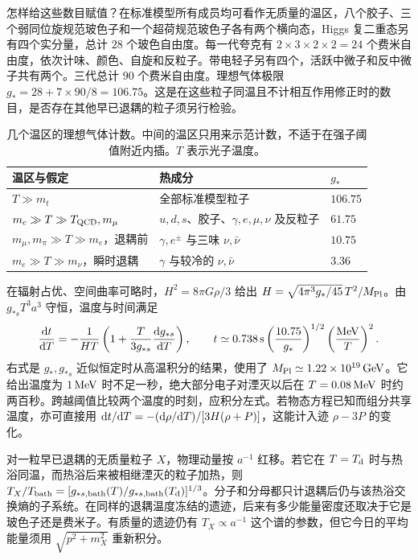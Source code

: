 怎样给这些数目赋值？在标准模型所有成员均可看作无质量的温区，八个胶子、三个弱同位旋规范玻色子和一个超荷规范玻色子各有两个横向态，Higgs 复二重态另有四个实分量，总计 $28$ 个玻色自由度。每一代夸克有 $2\times3\times2\times2=24$ 个费米自由度，依次计味、颜色、自旋和反粒子。带电轻子另有四个，活跃中微子和反中微子共有两个。三代总计 $90$ 个费米自由度。理想气体极限 $g_*=28+7\times90/8=106.75$。这是在这些粒子同温且不计相互作用修正时的数目，是否存在其他早已退耦的粒子须另行检验。

\begin{table}[htbp]
\centering\small
\caption{几个温区的理想气体计数。中间的温区只用来示范计数，不适于在强子阈值附近内插。$T$ 表示光子温度。}\label{tab:cosmo-thermal-dofs}
\begin{tabular}{@{}lll@{}}\toprule
温区与假定 & 热成分 & $g_*$ \\ \midrule
$T\gg m_t$ & 全部标准模型粒子 & $106.75$ \\
$m_c\gg T\gg T_{\rm QCD},m_\mu$ & $u,d,s$、胶子、$\gamma,e,\mu,\nu$ 及反粒子 & $61.75$ \\
$m_\mu,m_\pi\gg T\gg m_e$，退耦前 & $\gamma,e^\pm$ 与三味 $\nu,\bar\nu$ & $10.75$ \\
$m_e\gg T\gg m_\nu$，瞬时退耦 & $\gamma$ 与较冷的 $\nu,\bar\nu$ & $3.36$ \\ \bottomrule
\end{tabular}
\end{table}

在辐射占优、空间曲率可略时，$H^2=8\pi G\rho/3$ 给出 $H=\sqrt{4\pi^3g_*/45}\,T^2/M_{\rm Pl}$。由 $g_{*s}T^3a^3$ 守恒，温度与时间满足
\begin{equation}\label{eq:cosmo-T-clock}
 \frac{\dd t}{\dd T}=-\frac{1}{HT}
 \left(1+\frac{T}{3g_{*s}}\frac{\dd g_{*s}}{\dd T}\right),\qquad
 t\simeq0.738\,{\rm s}\left(\frac{10.75}{g_*}\right)^{1/2}
 \left(\frac{{\rm MeV}}{T}\right)^2 .
\end{equation}
右式是 $g_*,g_{*s}$ 近似恒定时从高温积分的结果，使用了 $M_{\rm Pl}\simeq1.22\times10^{19}\,{\rm GeV}$。它给出温度为 $1\,{\rm MeV}$ 时不足一秒，绝大部分电子对湮灭以后在 $T=0.08\,{\rm MeV}$ 时约两百秒。跨越阈值比较两个温度的时刻，应积分左式。若物态方程已知而组分共享温度，亦可直接用 $\dd t/\dd T=-(\dd\rho/\dd T)/[3H(\rho+P)]$，这能计入迹 $\rho-3P$ 的变化。

对一粒早已退耦的无质量粒子 $X$，物理动量按 $a^{-1}$ 红移。若它在 $T=T_{\rm d}$ 时与热浴同温，而热浴后来被相继湮灭的粒子加热，则 $T_X/T_{\rm bath}=[g_{*s,{\rm bath}}(T)/g_{*s,{\rm bath}}(T_{\rm d})]^{1/3}$。分子和分母都只计退耦后仍与该热浴交换熵的子系统。在同样的退耦温度冻结的遗迹，后来有多少能量密度还取决于它是玻色子还是费米子。有质量的遗迹仍有 $T_X\propto a^{-1}$ 这个谱的参数，但它今日的平均能量须用 $\sqrt{p^2+m_X^2}$ 重新积分。

